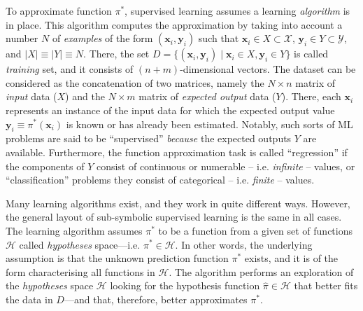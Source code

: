\documentclass[12pt,a4paper,openright,twoside]{book}
\begin{document}
To approximate function $\pi^*$, supervised learning assumes a learning \emph{algorithm} is in place.
%
This algorithm computes the approximation by taking into account a number $N$ of \emph{examples} of the form $(\mathbf{x}_i,\mathbf{y}_i)$ such that $\mathbf{x}_i \in X \subset \mathcal{X}$, $\mathbf{y}_i \in Y \subset \mathcal{Y}$, and $|X| \equiv |Y| \equiv N$.
%
There, the set $D = \{ (\mathbf{x}_i,\mathbf{y}_i) \mid \mathbf{x}_i \in X, \mathbf{y}_i \in Y \}$ is called \emph{training} set, and it consists of $(n+m)$-dimensional vectors.
%
The dataset can be considered as the concatenation of two matrices, namely the $N \times n$ matrix of \emph{input} data ($X$) and the $N \times m$ matrix of \emph{expected output} data ($Y$).
%
There, each $\mathbf{x}_i$ represents an instance of the input data for which the expected output value $\mathbf{y}_i \equiv \pi^*(\mathbf{x}_i)$ is known or has already been estimated.
%
Notably, such sorts of ML problems are said to be ``supervised'' \emph{because} the expected outputs $Y$ are available.
%
Furthermore, the function approximation task is called ``regression'' if the components of $Y$ consist of continuous or numerable -- i.e. \emph{infinite} -- values, or ``classification'' problems they consist of categorical -- i.e. \emph{finite} -- values.

Many learning algorithms exist, and they work in quite different ways.
%
However, the general layout of sub-symbolic supervised learning is the same in all cases.
%
The learning algorithm assumes $\pi^*$ to be a function from a given set of functions $\mathcal{H}$ called \emph{hypotheses} space---i.e. $\pi^* \in \mathcal{H}$.
%
In other words, the underlying assumption is that the unknown prediction function $\pi^*$ exists, and it is of the form characterising all functions in $\mathcal{H}$.
%
The algorithm performs an exploration of the \emph{hypotheses} space $\mathcal{H}$ looking for the hypothesis function $\hat{\pi} \in \mathcal{H}$ that better fits the data in $D$---and that, therefore, better approximates $\pi^*$.
\end{document}
